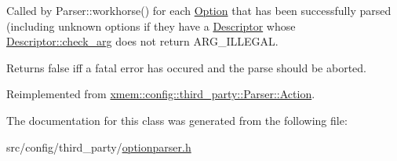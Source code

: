 Called by Parser\+::workhorse() for each \hyperlink{classxmem_1_1config_1_1third__party_1_1_option}{Option} that has been successfully parsed (including unknown options if they have a \hyperlink{structxmem_1_1config_1_1third__party_1_1_descriptor}{Descriptor} whose \hyperlink{structxmem_1_1config_1_1third__party_1_1_descriptor_a65b39f8d61de820bb5001d590e7dea5d}{Descriptor\+::check\+\_\+arg} does not return A\+R\+G\+\_\+\+I\+L\+L\+E\+G\+A\+L. 

Returns {\ttfamily false} iff a fatal error has occured and the parse should be aborted. 

Reimplemented from \hyperlink{structxmem_1_1config_1_1third__party_1_1_parser_1_1_action_aeffc43365955b3dc5f54552093518aa5}{xmem\+::config\+::third\+\_\+party\+::\+Parser\+::\+Action}.



The documentation for this class was generated from the following file\+:\begin{DoxyCompactItemize}
\item 
src/config/third\+\_\+party/\hyperlink{optionparser_8h}{optionparser.\+h}\end{DoxyCompactItemize}
